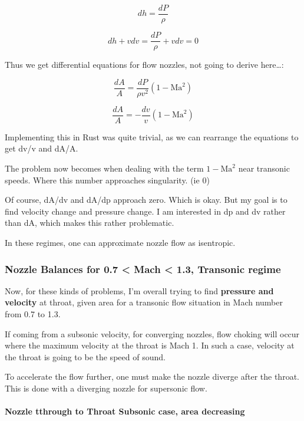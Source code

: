 \documentclass[masters]{ucbthesis}
\renewcommand{\_}{\kern-1.5pt\textunderscore\kern-1.5pt}
\begin{document}
\begin{equation*}
	dh =   \frac{dP}{\rho}
\end{equation*}

\begin{equation*}
	dh + vdv = \frac{dP}{\rho}  + v dv =  0
\end{equation*}

Thus we get differential equations for flow nozzles, not going to derive 
here\ldots:

\begin{equation}
	\frac{dA}{A} = \frac{dP}{\rho v^2} (1 - \text{Ma}^2)
\end{equation}

\begin{equation}
	\frac{dA}{A} = -\frac{dv}{v} (1 - \text{Ma}^2)
\end{equation}

Implementing this in Rust was quite trivial, as we can rearrange the 
equations to get dv/v and dA/A.

The problem now becomes when dealing with the term $1- \text{Ma}^2$
near transonic speeds. Where this number approaches singularity. (ie 0)

Of course, dA/dv and dA/dp approach zero. Which is okay. But my goal is 
to find velocity change and pressure change. I am interested in dp and dv 
rather than dA, which makes this rather problematic.

In these regimes, one can approximate nozzle flow as isentropic.


\subsubsection{Nozzle Balances for 0.7 < Mach <  1.3, Transonic regime}

Now, for these kinds of problems, I'm overall trying to find 
\textbf{pressure and velocity} at throat, given area for a transonic 
flow situation in Mach number from 0.7 to 1.3.

If coming from a subsonic velocity,
for converging nozzles, flow choking will occur where the maximum 
velocity at the throat is Mach 1. In such a case, velocity at the throat 
is going to be the speed of sound.

To accelerate the flow further, one must make the nozzle diverge after 
the throat. This is done with a diverging nozzle for supersonic flow.


\paragraph{Nozzle tthrough to Throat Subsonic case, area decreasing}
\end{document}
